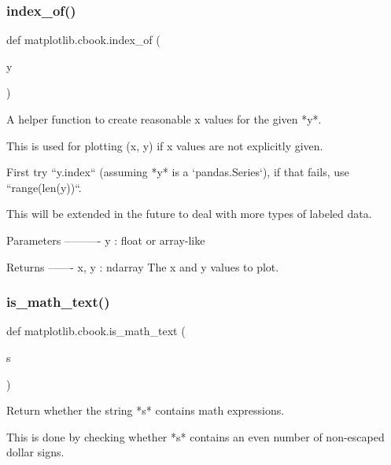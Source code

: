\subsubsection{\texorpdfstring{index\+\_\+of()}{index\_of()}}
{\footnotesize\ttfamily def matplotlib.\+cbook.\+index\+\_\+of (\begin{DoxyParamCaption}\item[{}]{y }\end{DoxyParamCaption})}

\begin{DoxyVerb}A helper function to create reasonable x values for the given *y*.

This is used for plotting (x, y) if x values are not explicitly given.

First try ``y.index`` (assuming *y* is a `pandas.Series`), if that
fails, use ``range(len(y))``.

This will be extended in the future to deal with more types of
labeled data.

Parameters
----------
y : float or array-like

Returns
-------
x, y : ndarray
   The x and y values to plot.
\end{DoxyVerb}
 \mbox{\label{namespacematplotlib_1_1cbook_af441c24cff462a6cd0aacd90ff7c7110}} 
\subsubsection{\texorpdfstring{is\+\_\+math\+\_\+text()}{is\_math\_text()}}
{\footnotesize\ttfamily def matplotlib.\+cbook.\+is\+\_\+math\+\_\+text (\begin{DoxyParamCaption}\item[{}]{s }\end{DoxyParamCaption})}

\begin{DoxyVerb}Return whether the string *s* contains math expressions.

This is done by checking whether *s* contains an even number of
non-escaped dollar signs.
\end{DoxyVerb}
 \mbox{\label{namespacematplotlib_1_1cbook_aa8e64eb7c542afa5d04be09e16c73607}} 

